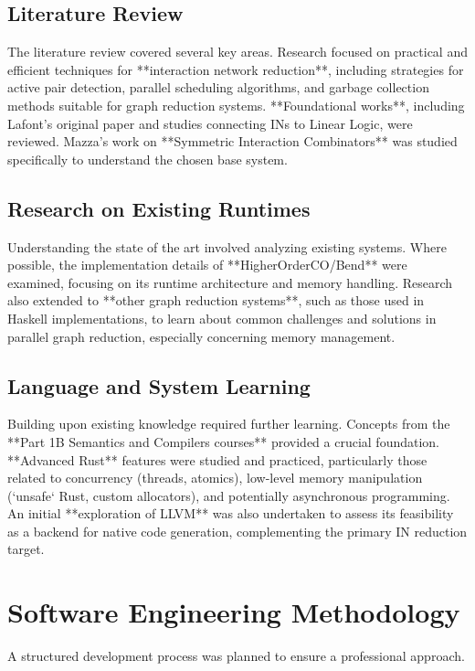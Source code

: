 \subsection{Literature Review} %
The literature review covered several key areas. Research focused on practical and efficient techniques for **interaction network reduction**, including strategies for active pair detection, parallel scheduling algorithms, and garbage collection methods suitable for graph reduction systems. **Foundational works**, including Lafont's original paper \cite{lafont1990interactionnets} and studies connecting INs to Linear Logic, were reviewed. Mazza's work on **Symmetric Interaction Combinators** \cite{mazza} was studied specifically to understand the chosen base system.

\subsection{Research on Existing Runtimes} %
Understanding the state of the art involved analyzing existing systems. Where possible, the implementation details of **HigherOrderCO/Bend** \cite{BendGithub} were examined, focusing on its runtime architecture and memory handling. Research also extended to **other graph reduction systems**, such as those used in Haskell implementations, to learn about common challenges and solutions in parallel graph reduction, especially concerning memory management.

\subsection{Language and System Learning} %
Building upon existing knowledge required further learning. Concepts from the **Part 1B Semantics and Compilers courses** provided a crucial foundation. **Advanced Rust** features were studied and practiced, particularly those related to concurrency (threads, atomics), low-level memory manipulation (`unsafe` Rust, custom allocators), and potentially asynchronous programming. An initial **exploration of LLVM** was also undertaken to assess its feasibility as a backend for native code generation, complementing the primary IN reduction target.

\section{Software Engineering Methodology} %
A structured development process was planned to ensure a professional approach.

